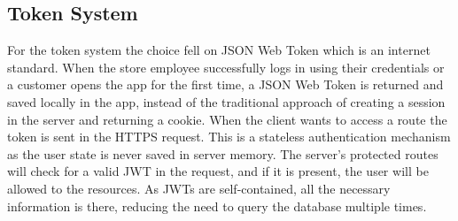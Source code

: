 \subsection{Token System}
For the token system the choice fell on JSON Web Token which is an internet standard.\newline
When the store employee successfully logs in using their credentials or a customer opens the app for the first time, a JSON Web Token is returned and saved locally in the app, instead of the traditional approach of creating a session in the server and returning a cookie.\newline
When the client wants to access a route the token is sent in the HTTPS request. This is a stateless authentication mechanism as the user state is never saved in server memory. The server's protected routes will check for a valid JWT in the request, and if it is present, the user will be allowed to the resources.\newline
As JWTs are self-contained, all the necessary information is there, reducing the need to query the database multiple times.
